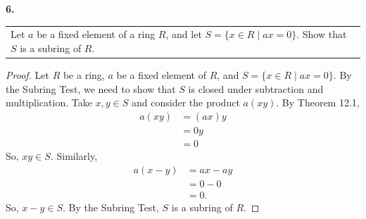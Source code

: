 \documentclass[12pt, letterpaper]{article}
\begin{document}
\textbf{6.} \begin{tabular}[t]{@{}p{}@{}}
    Let $a$ be a fixed element of a ring $R$, and let $S = \{x \in R \mid ax = 0\}$. Show that $S$ is a subring of $R$.
\end{tabular}
\begin{proof}
    Let $R$ be a ring, $a$ be a fixed element of $R$, and $S = \{x \in R \mid ax = 0\}$. By the Subring Test, we need to show that $S$ is closed under subtraction and multiplication. Take $x, y \in S$ and consider the product $a(xy)$. By Theorem 12.1,
    \begin{align*}
        a(xy) &= (ax)y \\
        &= 0y \\
        &= 0
        \end{align*}
    So, $xy \in S$. Similarly,
    \begin{align*}
        a(x-y) &= ax - ay \\
        &= 0 - 0 \\
        &= 0.
    \end{align*}
    So, $x-y \in S$. By the Subring Test, $S$ is a subring of $R$.
    \end{proof}
\end{document}

